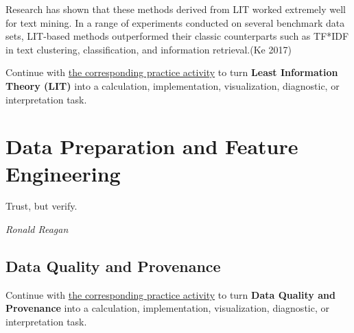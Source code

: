 \documentclass[
  letterpaper,
]{scrbook}
\begin{document}
Research has shown that these methods derived from LIT worked extremely
well for text mining. In a range of experiments conducted on several
benchmark data sets, LIT-based methods outperformed their classic
counterparts such as TF*IDF in text clustering, classification, and
information retrieval.(Ke 2017)

\begin{tcolorbox}[enhanced jigsaw, arc=.35mm, bottomrule=.15mm, bottomtitle=1mm, breakable, colback=white, colbacktitle=quarto-callout-tip-color!10!white, colframe=quarto-callout-tip-color-frame, coltitle=black, left=2mm, leftrule=.75mm, opacityback=0, opacitybacktitle=0.6, rightrule=.15mm, title=\textcolor{quarto-callout-tip-color}{\faLightbulb}\hspace{0.5em}{Put it into practice}, titlerule=0mm, toprule=.15mm, toptitle=1mm]

Continue with \hyperref[sec-pr-05-least-information-theory-lit]{the
corresponding practice activity} to turn \textbf{Least Information
Theory (LIT)} into a calculation, implementation, visualization,
diagnostic, or interpretation task.

\end{tcolorbox}

\chapter{Data Preparation and Feature Engineering}\label{ch-preparation}

Trust, but verify.

\emph{Ronald Reagan}

\section{Data Quality and Provenance}\label{data-quality-and-provenance}

\begin{tcolorbox}[enhanced jigsaw, arc=.35mm, bottomrule=.15mm, bottomtitle=1mm, breakable, colback=white, colbacktitle=quarto-callout-tip-color!10!white, colframe=quarto-callout-tip-color-frame, coltitle=black, left=2mm, leftrule=.75mm, opacityback=0, opacitybacktitle=0.6, rightrule=.15mm, title=\textcolor{quarto-callout-tip-color}{\faLightbulb}\hspace{0.5em}{Put it into practice}, titlerule=0mm, toprule=.15mm, toptitle=1mm]

Continue with \hyperref[sec-pr-06-data-quality-and-provenance]{the
corresponding practice activity} to turn \textbf{Data Quality and
Provenance} into a calculation, implementation, visualization,
diagnostic, or interpretation task.

\end{tcolorbox}
\end{document}
